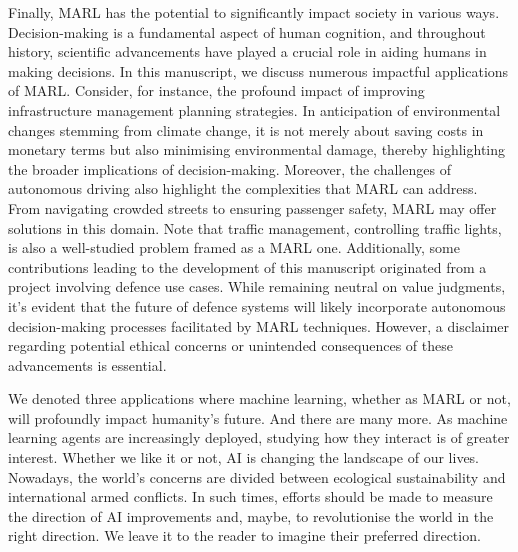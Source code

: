 Finally, MARL has the potential to significantly impact society in various ways.
Decision-making is a fundamental aspect of human cognition, and throughout history, scientific advancements have played a crucial role in aiding humans in making decisions.
In this manuscript, we discuss numerous impactful applications of MARL.
Consider, for instance, the profound impact of improving infrastructure management planning strategies.
In anticipation of environmental changes stemming from climate change, it is not merely about saving costs in monetary terms but also minimising environmental damage, thereby highlighting the broader implications of decision-making.
Moreover, the challenges of autonomous driving also highlight the complexities that MARL can address.
From navigating crowded streets to ensuring passenger safety, MARL may offer solutions in this domain.
Note that traffic management, controlling traffic lights, is also a well-studied problem framed as a MARL one.
Additionally, some contributions leading to the development of this manuscript originated from a project involving defence use cases.
While remaining neutral on value judgments, it's evident that the future of defence systems will likely incorporate autonomous decision-making processes facilitated by MARL techniques.
However, a disclaimer regarding potential ethical concerns or unintended consequences of these advancements is essential.

We denoted three applications where machine learning, whether as MARL or not, will profoundly impact humanity's future.
And there are many more.
As machine learning agents are increasingly deployed, studying how they interact is of greater interest.
Whether we like it or not, AI is changing the landscape of our lives.
Nowadays, the world's concerns are divided between ecological sustainability and international armed conflicts.
In such times, efforts should be made to measure the direction of AI improvements and, maybe, to revolutionise the world in the right direction.
We leave it to the reader to imagine their preferred direction.